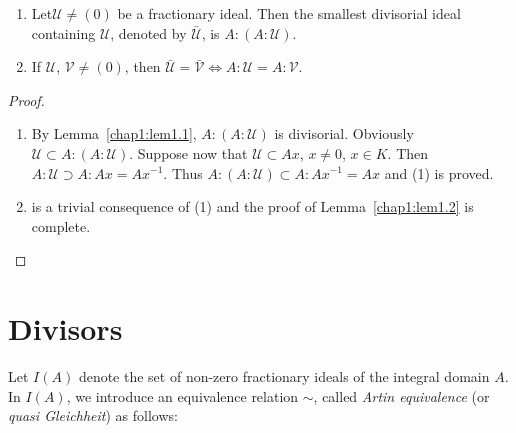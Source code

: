 \begin{lemma}\label{chap1:lem1.2} %
\begin{enumerate}[(1)]
\item Let\pageoriginale $\mathscr{U} \neq (0)$ be a fractionary
  ideal. Then the 
  smallest divisorial ideal containing $\mathscr{U}$, denoted by
  $\bar{\mathscr{U}}$, is $A : (A : \mathscr{U})$. 

\item If $\mathscr{U}$, $\mathscr{V} \neq (0)$, then $\bar{\mathscr{U}}
  = \bar{\mathscr{V}} \Leftrightarrow A : \mathscr{U} = A :
  \mathscr{V}$.
\end{enumerate}
\end{lemma}

\begin{proof}
\begin{enumerate} [(1)]
\item By Lemma~\ref{chap1:lem1.1}, $A : (A : \mathscr{U})$ is
  divisorial. Obviously 
  $\mathscr{U} \subset A : (A : \mathscr{U})$. Suppose now that
  $\mathscr{U} \subset A x$, $x \neq 0$, $x \in K$. Then $A : \mathscr{U}
  \supset A : A x = A x^{-1}$. Thus $A : (A : \mathscr{U}) \subset A :
  A x^{-1} = Ax$ and (1) is proved. 

\item is a trivial consequence of (1) and the proof of 
Lemma~\ref{chap1:lem1.2} is complete.  
\end{enumerate}
\end{proof}


\section{Divisors}\label{chap1:sec2}%
Let $I(A)$ denote the set of non-zero fractionary ideals of the
integral domain $A$. In $I(A)$, we introduce an equivalence relation
$\sim$, called \textit{Artin equivalence} (or \textit{quasi
  Gleichheit}) as follows:  

